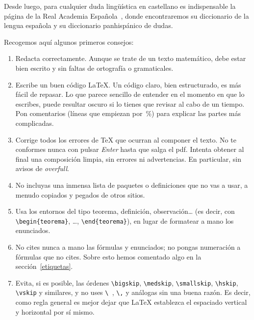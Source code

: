 \documentclass[11pt]{book}
\theoremstyle{plain} %
\newtheorem{teorema}{Teorema}[chapter]
\theoremstyle{definition} %
\begin{document}

Desde luego, para cualquier duda lingüística en castellano es indispensable la 
página de la Real Academia Española~\cite{RAE}, donde encontraremos su 
diccionario de la lengua española y su diccionario panhispánico de dudas.

Recogemos aquí algunos primeros consejos:
\begin{enumerate} 
\item Redacta correctamente. Aunque se trate de un texto matemático, debe estar 
bien escrito y sin faltas de ortografía o gramaticales.

\item Escribe un buen código {\LaTeX}. Un código claro, bien estructurado, es más 
fácil de repasar. Lo que parece sencillo de entender en el momento en que lo 
escribes, puede resultar oscuro si lo tienes que revisar al cabo de un tiempo. 
Pon comentarios (líneas que empiezan por~\%) para explicar las partes más 
complicadas.

\item Corrige todos los errores de {\TeX} que ocurran al componer el texto. No te 
conformes nunca con pulsar \emph{Enter} hasta que salga el pdf. Intenta obtener 
al final una composición limpia, sin errores ni 
advertencias. En particular, sin avisos de \emph{overfull}.

\item No incluyas una inmensa lista de paquetes o definiciones 
que no vas a usar, a menudo copiados y pegados de otros sitios.

\item Usa los entornos del tipo teorema, definición, observación{\dots} (es 
decir, con \verb"\begin{teorema}", \dots, \verb"\end{teorema}"), en lugar de 
formatear a mano los enunciados.

\item No cites nunca a mano las fórmulas y enunciados; no pongas numeración a 
fórmulas que no cites. Sobre esto hemos comentado algo en la 
sección~\ref{etiquetas}.

\item Evita, si es posible, las órdenes \verb"\bigskip", \verb"\medskip", 
\verb"\smallskip", \verb"\hskip", \verb"\vskip" y similares, y no uses \verb"\ ", 
\verb"\," y análogas sin una buena razón. Es decir, como regla general es mejor 
dejar que {\LaTeX} establezca el espaciado vertical y horizontal por sí mismo.


\end{enumerate}
\end{document}
